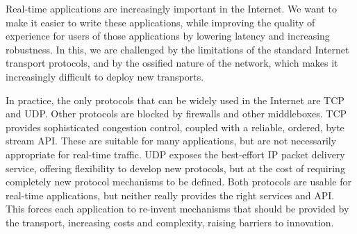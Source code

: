 \documentclass{sig-alternate-05-2015}
\begin{document}
%

Real-time applications are increasingly important in the Internet. 
We want to make it easier to write these applications, while improving
the quality of experience for users of those applications by lowering
latency and increasing robustness. 
In this, we are challenged by the limitations of the standard Internet 
transport protocols, and by the ossified nature of the network, which makes
it increasingly difficult to deploy new transports. 


In practice, the only protocols that can be widely used in the Internet are
TCP and UDP. Other protocols are blocked by firewalls and other middleboxes.  
TCP provides sophisticated congestion control, coupled with a reliable,
ordered, byte stream API. These are suitable for many applications, but are
not necessarily appropriate for real-time traffic.  UDP exposes the best-effort 
IP packet delivery service, offering flexibility to develop new protocols,
but at the cost of requiring completely new protocol mechanisms to be
defined. Both protocols are usable for real-time applications, but neither
really provides the right services and API.  This forces each application
to re-invent mechanisms that should be provided by the transport, increasing 
costs and complexity, raising barriers to innovation.

\end{document}
